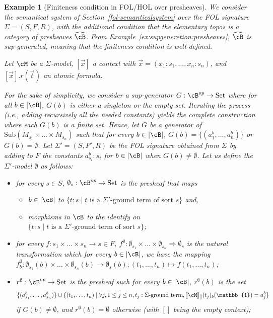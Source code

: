 \documentclass[preprint,3p,times]{elsarticle}
\newtheorem{example}[definition]{Example}
\newcommand{\Set}{\mathrm{Set}}
\newcommand{\Sub}{\mathrm{Sub}}
\def\sem#1{[\![ #1 ] \!]}
\renewcommand{\hat}{\widehat}
\newcommand{\set}[1]{\{#1\}}                                %
\begin{document}
\begin{example}[Finiteness condition in FOL/HOL over presheaves]
\label{ex:finiteness FOL}
We consider the semantical system of Section~\ref{fol-semanticalsystem} over the FOL signature $\Sigma = (S,F,R)$, with the additional condition that the elementary topos is a category of presheaves $\hat{\cB}$. From Example~\ref{ex:supgeneretion:presheaves}, $\hat{\cB}$ is sup-generated, meaning that the finiteness condition is well-defined.

Let $\cM$ be a $\Sigma$-model, \([\vec{x}]\) a context with $\vec{x} = (x_1:s_1,\ldots,x_n:s_n)$, and $[\vec{x}].r(\vec{t})$ an atomic formula.

For the sake of simplicity, we consider a sup-generator $G: \cB^{op} \to \Set$ where for all $b \in |\cB|$, $G(b)$ is either a singleton or the empty set.
Iterating the process (i.e., adding recursively all the needed constants) yields the complete construction where each $G(b)$ is a finite set.
Hence, let $G$ be a generator of $\Sub(M_{s_1} \times \ldots \times M_{s_n})$ such that for every $b \in |\cB|$, $G(b) = \{(a^b_1,\ldots,a^b_n)\}$ or $G(b) = \emptyset$. Let $\Sigma' = (S,F',R)$ be the FOL signature obtained from $\Sigma$ by adding to $F$ the constants $a^b_{s_i} : s_i$ for $b \in |\cB|$ when $G(b) \neq \emptyset$. Let us define the $\Sigma'$-model $\emptyset$ as follows:

\begin{itemize}
    \item for every $s \in S$, $\emptyset_s : \cB^{op} \to \Set$ is the presheaf that maps
    \begin{itemize}
        \item \(b \in | \cB|\) to \(\{t:s \mid t \text{ is a } \Sigma'\text{-ground term of sort } s\}\) and,
        \item morphisms in \(\cB\) to the identify on \(\{t:s \mid t \text{ is a } \Sigma'\text{-ground term of sort } s\}\);
    \end{itemize}

    
    \item for every $f : s_1 \times \ldots \times s_n \to s \in F$, $f^\emptyset: \emptyset_{s_1} \times \ldots \times \emptyset_{s_n} \Rightarrow \emptyset_s$ is the natural transformation which for every $b \in |\cB|$, we have the mapping $f^\emptyset_b : \emptyset_{s_1}(b) \times \ldots \times \emptyset_{s_n}(b) \to \emptyset_s(b);(t_1,\ldots,t_n) \mapsto f(t_1,\ldots,t_n)$;
    \item $r^\emptyset : \cB^{op} \to \Set$ is the presheaf such for every $b \in |\cB|$, $r^\emptyset(b)$ is the set
    \[
        \set{(a^b_{s_1},\ldots,a^b_{s_n})}
        \cup
        \set{(t_1,\ldots,t_n) \mid \forall j, 1 \leq j \leq n, t_j:\mbox{$\Sigma$-ground term},\sem{\cM}_{[]}(t_j)_b(\mathbb{1}) = a^b_j}
    \]
    if $G(b) \neq \emptyset$, and $r^\emptyset(b) = \emptyset$ otherwise (with \([]\) being the empty context);


\end{itemize}
\end{example}
\end{document}
